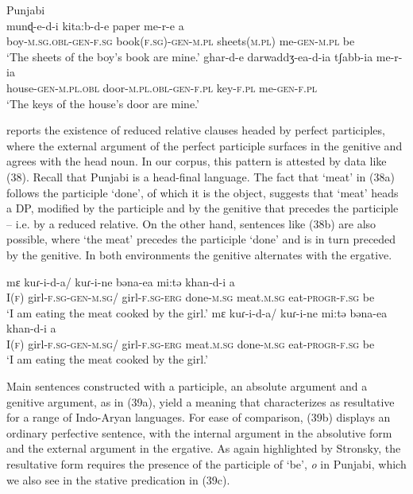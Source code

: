 \documentclass[output=paper]{langsci/langscibook}
\begin{document}
\ea%
    Punjabi\label{ex:manzini:37}\\
    \ea
    \gll munɖ-e-d-i   kita:b-d-e   paper   me-r-e  a \\
         boy-\textsc{m.sg.obl-gen-f.sg}   book\textsc{(f.sg)-gen-m.pl}  sheets\textsc{(m.pl)}  me-\textsc{gen-m.pl}   be \\
    \glt ‘The sheets of the boy’s book are mine.’
    \ex
    \gll ghar-d-e   darwaddʒ-ea-d-ia   tʃabb-ia   me-r-ia\\
         house-\textsc{gen-m.pl.obl}  door-\textsc{m.pl.obl-gen-f.pl}  key-\textsc{f.pl}  me-\textsc{gen-f.pl}    \\
    \glt ‘The keys of the house’s door are mine.’
    \z
\z

\citet[295]{Payne1995} reports the existence of reduced relative clauses headed by perfect participles, where the external argument of the perfect participle surfaces in the genitive and agrees with the head noun. In our corpus, this pattern is attested by data like (38). Recall that Punjabi is a head-final language. The fact that ‘meat’ in (38a) follows the participle ‘done’, of which it is the object, suggests that ‘meat’ heads a DP, modified by the participle and by the genitive that precedes the participle – i.e. by a reduced relative. On the other hand, sentences like (38b) are also possible, where ‘the meat’ precedes the participle ‘done’ and is in turn preceded by the genitive. In both environments the genitive alternates with the ergative.

\ea%
    \label{ex:manzini:38}
    \ea
    \gll mɛ  kuɾ-i-d-a/  kuɾ-i-ne  bəna-ea      mi:tə      khan-d-i   a\\
         I(\textsc{f})  girl-\textsc{f.sg-gen-m.sg}/  girl-\textsc{f.sg-erg}  done-\textsc{m.sg}  meat.\textsc{m.sg}  eat-\textsc{progr-f.sg}  be\\
    \glt ‘I am eating the meat cooked by the girl.’
    \ex
    \gll mɛ  kuɾ-i-d-a/   kuɾ-i-ne   mi:tə  bəna-ea     khan-d-i   a\\
         I(\textsc{f})  girl-\textsc{f.sg-gen-m.sg}/  girl-\textsc{f.sg-erg}   meat.\textsc{m.sg}  done-\textsc{m.sg}   eat-\textsc{progr-f.sg}   be\\
    \glt ‘I am eating the meat cooked by the girl.’
    \z
\z

Main sentences constructed with a participle, an absolute argument and a genitive argument, as in (39a), yield a meaning that \citet{Stronsky2013} characterizes as resultative for a range of Indo-Aryan languages. For ease of comparison, (39b) displays an ordinary perfective sentence, with the internal argument in the absolutive form and the external argument in the ergative. As again highlighted by Stronsky, the resultative form requires the presence of the participle of ‘be’, \textit{o} in Punjabi, which we also see in the stative predication in (39c).
\end{document}
